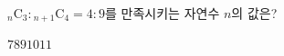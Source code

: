 \hspace*{2mm}\begin{minipage}[t]{\dimexpr\linewidth-2mm\relax}\vspace{0pt}
${}_n\mathrm{C}_3 : {}_{n+1}\mathrm{C}_4 = 4 : 9$를 만족시키는 자연수 $n$의 값은?
\begin{choices32}{$7$}{$8$}{$9$}{$10$}{$11$}\end{choices32}\end{minipage}
